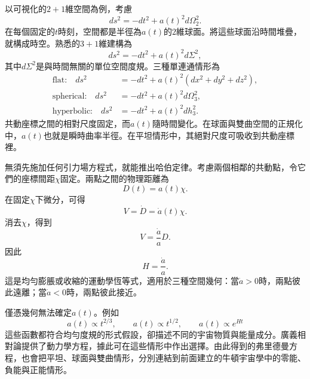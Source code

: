 以可視化的\(2+1\)維空間為例，考慮
\begin{equation}
ds^2 = -dt^2 + a(t)^2 d\Omega_2^2.
\label{eq:c03-two-plus-one}
\end{equation}
在每個固定的\(t\)時刻，空間都是半徑為\(a(t)\)的\(2\)維球面。將這些球面沿時間堆疊，就構成時空。熟悉的\(3+1\)維建構為
\begin{equation}
ds^2 = -dt^2 + a(t)^2 d\Sigma^2,
\label{eq:c03-frw-general}
\end{equation}
其中\(d\Sigma^2\)是與時間無關的單位空間度規。三種單連通情形為
\begin{align}
\text{flat:}\quad
ds^2&=-dt^2+a(t)^2\left(dx^2+dy^2+dz^2\right),\label{eq:c03-frw-flat}\\
\text{spherical:}\quad
ds^2&=-dt^2+a(t)^2d\Omega_3^2,\label{eq:c03-frw-spherical}\\
\text{hyperbolic:}\quad
ds^2&=-dt^2+a(t)^2dh_3^2.\label{eq:c03-frw-hyperbolic}
\end{align}
共動座標之間的相對尺度固定，而\(a(t)\)隨時間變化。在球面與雙曲空間的正規化中，\(a(t)\)也就是瞬時曲率半徑。在平坦情形中，其絕對尺度可吸收到共動座標裡。

無須先施加任何引力場方程式，就能推出哈伯定律。考慮兩個相鄰的共動點，令它們的座標間距\(\chi\)固定。兩點之間的物理距離為
\begin{equation}
D(t)=a(t)\chi.
\label{eq:c03-comoving-distance}
\end{equation}
在固定\(\chi\)下微分，可得
\begin{equation}
V=\dot D=\dot a(t)\chi.
\end{equation}
消去\(\chi\)，得到
\begin{equation}
V = \frac{\dot a}{a} D.
\label{eq:c03-hubble-law}
\end{equation}
因此
\begin{equation}
H = \frac{\dot a}{a}.
\label{eq:c03-hubble-parameter}
\end{equation}
這是均勻膨脹或收縮的運動學恆等式，適用於三種空間幾何：當\(\dot a>0\)時，兩點彼此遠離；當\(\dot a<0\)時，兩點彼此接近。

僅憑幾何無法確定\(a(t)\)。例如\begin{equation}
a(t)\propto t^{2/3},
\qquad
a(t)\propto t^{1/2},
\qquad
a(t)\propto e^{Ht}
\end{equation}這些函數都符合均勻度規的形式假設，卻描述不同的宇宙物質與能量成分。廣義相對論提供了動力學方程，據此可在這些情形中作出選擇。由此得到的弗里德曼方程，也會把平坦、球面與雙曲情形，分別連結到前面建立的牛頓宇宙學中的零能、負能與正能情形。

